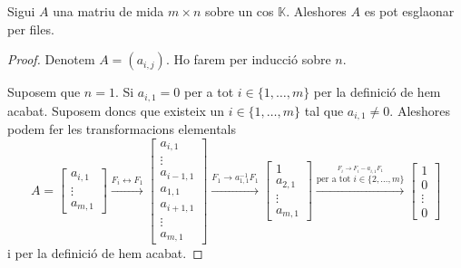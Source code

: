 \documentclass[../Apunts.tex]{subfiles}
\begin{document}
	\begin{proposition}
		\label{prop:es pot esglaonar qualsevol matriu per files}
		Sigui \(A\) una matriu de mida \(m\times n\) sobre un cos \(\mathbb{K}\). Aleshores \(A\) es pot esglaonar per files.
		\begin{proof} %
			Denotem \(A=(a_{i,j})\). Ho farem per inducció sobre \(n\).
			
			Suposem que \(n=1\). Si \(a_{i,1}=0\) per a tot \(i\in\{1,\dots,m\}\) per la definició de  hem acabat. Suposem doncs que existeix un \(i\in\{1,\dots,m\}\) tal que \(a_{i,1}\neq0\). Aleshores podem fer les transformacions elementals
			\[A=
			\left[\begin{matrix}
			a_{i,1}\\
			\vdots\\
			a_{m,1}
			\end{matrix}\right]
			\overset{F_{i}\leftrightarrow F_{1}}{\longrightarrow}
			\left[\begin{matrix}
			a_{i,1}\\
			\vdots\\
			a_{i-1,1}\\
			a_{1,1}\\
			a_{i+1,1}\\
			\vdots\\
			a_{m,1}
			\end{matrix}\right]
			\overset{F_{1}\rightarrow a_{1,1}^{-1}F_{1}}{\longrightarrow}
			\left[\begin{matrix}
			1\\
			a_{2,1}\\
			\vdots\\
			a_{m,1}
			\end{matrix}\right]
			\overset{\overset{F_{i}\rightarrow F_{i}-a_{i,1}F_{1}}{\text{per a tot }i\in\{2,\dots,m\}}}{\longrightarrow}
			\left[\begin{matrix}
			1\\
			0\\
			\vdots\\
			0
			\end{matrix}\right]\]
			i per la definició de  hem acabat.
			

\end{proof}
\end{proposition}
\end{document}
